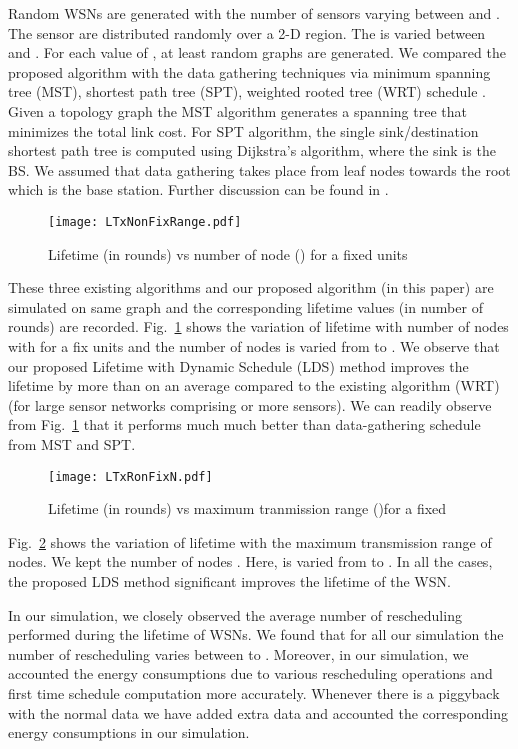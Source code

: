\documentclass[10pt]{llncs}
\begin{document}
Random WSNs are generated with the number of sensors varying between  and . The sensor are distributed randomly over a  2-D region. The  is varied between  and . For each value of , at least  random graphs are generated. We compared the proposed algorithm with the data gathering techniques via minimum spanning tree (MST), shortest path tree (SPT), weighted rooted tree (WRT) schedule \cite{Bhattacharjee07}. Given a topology graph the MST algorithm generates a spanning tree that minimizes the total link cost. For SPT algorithm, the single sink/destination shortest path tree is computed using Dijkstra's algorithm, where the sink is the BS. We assumed that data gathering takes place from leaf nodes towards the root which is the base station. Further discussion can be found in \cite{Bhattacharjee07}.

\begin{figure}[!ht]
\centerline{\texttt{[image: LTxNonFixRange.pdf]}}
\caption{Lifetime (in rounds) vs number of node () for a fixed  units}
\label{Plot:fixRange}
\end{figure}

These three existing algorithms and our proposed algorithm (in this paper) are simulated on same graph and the corresponding lifetime values (in number of rounds) are recorded. Fig.~\ref{Plot:fixRange} shows the variation of lifetime with number of nodes with for a fix  units and the number of nodes  is varied from  to . We observe that our proposed Lifetime with Dynamic Schedule (LDS) method improves the lifetime by more than  on an average compared to the existing algorithm (WRT) \cite{Bhattacharjee07} (for large sensor networks comprising  or more sensors). We can readily observe from Fig.~\ref{Plot:fixRange} that it performs much much better than data-gathering schedule from MST and SPT.

\begin{figure}[!ht]
\centerline{\texttt{[image: LTxRonFixN.pdf]}}
\caption{Lifetime (in rounds) vs maximum tranmission range ()for a fixed }
\label{Plot:fixN}
\end{figure}

Fig.~\ref{Plot:fixN} shows the variation of lifetime with the maximum transmission range of nodes. We kept the number of nodes . Here,  is varied from  to . In all the cases, the proposed LDS method significant improves the lifetime of the WSN. 

In our simulation, we closely observed the average number of rescheduling performed during the lifetime of WSNs. We found that for all our simulation the number of rescheduling varies between  to . Moreover, in our simulation, we accounted the energy consumptions due to various rescheduling operations and first time schedule computation more accurately. Whenever there is a piggyback with the normal data we have added  extra data and accounted the corresponding energy consumptions in our simulation.
\end{document}
